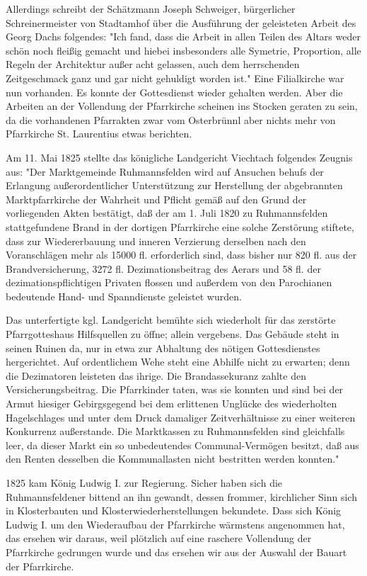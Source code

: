 \documentclass{book}
\begin{document}
Allerdings schreibt der Schätzmann Joseph Schweiger, bürgerlicher
Schreinermeister von Stadtamhof über die Ausführung der geleisteten Arbeit des
Georg Dachs folgendes: "Ich fand, dass die Arbeit in allen Teilen des Altars
weder schön noch fleißig gemacht und hiebei insbesonders alle Symetrie,
Proportion, alle Regeln der Architektur außer acht gelassen, auch dem
herrschenden Zeitgeschmack ganz und gar nicht gehuldigt worden ist." Eine
Filialkirche war nun vorhanden. Es konnte der Gottesdienst wieder gehalten
werden. Aber die Arbeiten an der Vollendung der Pfarrkirche scheinen ins Stocken
geraten zu sein, da die vorhandenen Pfarrakten zwar vom Osterbrünnl aber nichts
mehr von Pfarrkirche St. Laurentius etwas berichten.

Am 11. Mai 1825 stellte das königliche Landgericht Viechtach folgendes Zeugnis
aus: "Der Marktgemeinde Ruhmannsfelden wird auf Ansuchen behufs der Erlangung
außerordentlicher Unterstützung zur Herstellung der abgebrannten
Marktpfarrkirche der Wahrheit und Pflicht gemäß auf den Grund der vorliegenden
Akten bestätigt, daß der am 1. Juli 1820 zu Ruhmannsfelden stattgefundene Brand
in der dortigen Pfarrkirche eine solche Zerstörung stiftete, dass zur
Wiedererbauung und inneren Verzierung derselben nach den Voranschlägen mehr als
15000 fl. erforderlich sind, dass bisher nur 820 fl. aus der Brandversicherung,
3272 fl. Dezimationsbeitrag des Aerars und 58 fl. der dezimationspflichtigen
Privaten flossen und außerdem von den Parochianen bedeutende Hand- und
Spanndienste geleistet wurden.

Das unterfertigte kgl. Landgericht bemühte sich wiederholt für das zerstörte
Pfarrgotteshaus Hilfsquellen zu öffne; allein vergebens. Das Gebäude steht in
seinen Ruinen da, nur in etwa zur Abhaltung des nötigen Gottesdienstes
hergerichtet. Auf ordentlichem Wehe steht eine Abhilfe nicht zu erwarten; denn
die Dezimatoren leisteten das ihrige. Die Brandassekuranz zahlte den
Versicherungsbeitrag. Die Pfarrkinder taten, was sie konnten und sind bei der
Armut hiesiger Gebirgsgegend bei dem erlittenen Unglücke des wiederholten
Hagelschlages und unter dem Druck damaliger Zeitverhältnisse zu einer weiteren
Konkurrenz außerstande. Die Marktkassen zu Ruhmannsfelden sind gleichfalls leer,
da dieser Markt ein so unbedeutendes Communal-Vermögen besitzt, daß aus den
Renten desselben die Kommunallasten nicht bestritten werden konnten."

1825 kam König Ludwig I. zur Regierung. Sicher haben sich die Ruhmannsfeldener
bittend an ihn gewandt, dessen frommer, kirchlicher Sinn sich in Klosterbauten
und Klosterwiederherstellungen bekundete. Dass sich König Ludwig I. um den
Wiederaufbau der Pfarrkirche wärmstens angenommen hat, das ersehen wir daraus,
weil plötzlich auf eine raschere Vollendung der Pfarrkirche gedrungen wurde und
das ersehen wir aus der Auswahl der Bauart der Pfarrkirche.
\end{document}
